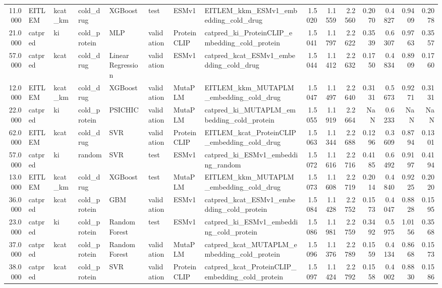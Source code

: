 \begin{tabular}{rlllllllrrrrrrr}
11.0000 & EITLEM & kcat_km & cold_drug & XGBoost & test & ESMv1 & EITLEM_kkm_ESMv1_embedding_cold_drug & 1.5020 & 1.1559 & 2.2560 & 0.2070 & 0.4827 & 0.9409 & 0.2078 \\
21.0000 & catpred & ki & cold_protein & MLP & validation & ProteinCLIP & catpred_ki_ProteinCLIP_embedding_cold_protein & 1.5041 & 1.1797 & 2.2622 & 0.3539 & 0.6307 & 0.9763 & 0.3557 \\
57.0000 & catpred & kcat & cold_drug & Linear Regression & validation & ESMv1 & catpred_kcat_ESMv1_embedding_cold_drug & 1.5044 & 1.1412 & 2.2632 & 0.1750 & 0.4834 & 0.8909 & 0.1760 \\
12.0000 & EITLEM & kcat_km & cold_drug & XGBoost & validation & MutaPLM & EITLEM_kkm_MUTAPLM_embedding_cold_drug & 1.5047 & 1.1497 & 2.2640 & 0.3131 & 0.5673 & 0.9271 & 0.3131 \\
22.0000 & catpred & ki & cold_protein & PSICHIC & validation & MutaPLM & catpred_ki_MUTAPLM_embedding_cold_protein & 1.5055 & 1.1919 & 2.2664 & NaN & 0.6233 & NaN & NaN \\
62.0000 & EITLEM & kcat & cold_drug & SVR & validation & ProteinCLIP & EITLEM_kcat_ProteinCLIP_embedding_cold_drug & 1.5063 & 1.1344 & 2.2688 & 0.1296 & 0.3609 & 0.8794 & 0.1301 \\
57.0000 & catpred & ki & random & SVR & test & ESMv1 & catpred_ki_ESMv1_embedding_random & 1.5072 & 1.1616 & 2.2716 & 0.4185 & 0.6492 & 0.9197 & 0.4194 \\
13.0000 & EITLEM & kcat_km & cold_drug & XGBoost & test & MutaPLM & EITLEM_kkm_MUTAPLM_embedding_cold_drug & 1.5073 & 1.1608 & 2.2719 & 0.2014 & 0.4840 & 0.9225 & 0.2020 \\
36.0000 & catpred & kcat & cold_protein & GBM & validation & ESMv1 & catpred_kcat_ESMv1_embedding_cold_protein & 1.5084 & 1.1428 & 2.2752 & 0.1573 & 0.4047 & 0.8828 & 0.1595 \\
23.0000 & catpred & ki & cold_protein & Random Forest & test & ESMv1 & catpred_ki_ESMv1_embedding_cold_protein & 1.5086 & 1.1981 & 2.2759 & 0.3492 & 0.5975 & 1.0156 & 0.3568 \\
37.0000 & catpred & kcat & cold_protein & Random Forest & validation & MutaPLM & catpred_kcat_MUTAPLM_embedding_cold_protein & 1.5096 & 1.1376 & 2.2789 & 0.1559 & 0.4134 & 0.8668 & 0.1573 \\
38.0000 & catpred & kcat & cold_protein & SVR & validation & ProteinCLIP & catpred_kcat_ProteinCLIP_embedding_cold_protein & 1.5097 & 1.1424 & 2.2792 & 0.1558 & 0.4002 & 0.8830 & 0.1586 \\

\end{tabular}
